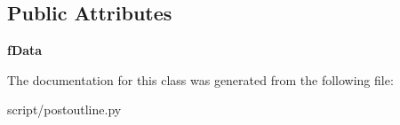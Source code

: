 \subsection*{Public Attributes}
\begin{DoxyCompactItemize}
\item 
\hypertarget{classpostoutline_1_1_post_outline_a89ea3b63a304fc8c9721606316555173}{}{\bfseries f\+Data}\label{classpostoutline_1_1_post_outline_a89ea3b63a304fc8c9721606316555173}

\end{DoxyCompactItemize}


The documentation for this class was generated from the following file\+:\begin{DoxyCompactItemize}
\item 
script/postoutline.\+py\end{DoxyCompactItemize}
